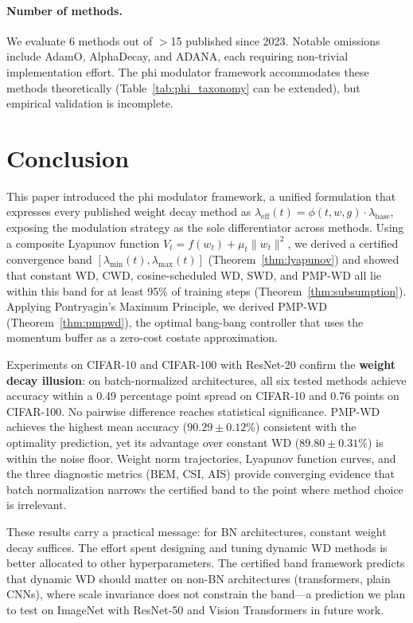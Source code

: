 \documentclass{article}
\begin{document}
\paragraph{Number of methods.} We evaluate 6 methods out of $>$15 published since 2023. Notable omissions include AdamO, AlphaDecay, and ADANA, each requiring non-trivial implementation effort. The phi modulator framework accommodates these methods theoretically (Table~\ref{tab:phi_taxonomy} can be extended), but empirical validation is incomplete.

\section{Conclusion}
\label{sec:conclusion}

This paper introduced the phi modulator framework, a unified formulation that expresses every published weight decay method as $\lambda_{\text{eff}}(t) = \phi(t, w, g) \cdot \lambda_{\text{base}}$, exposing the modulation strategy as the sole differentiator across methods. Using a composite Lyapunov function $V_t = f(w_t) + \mu_t\|w_t\|^2$, we derived a certified convergence band $[\lambda_{\min}(t), \lambda_{\max}(t)]$ (Theorem~\ref{thm:lyapunov}) and showed that constant WD, CWD, cosine-scheduled WD, SWD, and PMP-WD all lie within this band for at least 95\% of training steps (Theorem~\ref{thm:subsumption}). Applying Pontryagin's Maximum Principle, we derived PMP-WD (Theorem~\ref{thm:pmpwd}), the optimal bang-bang controller that uses the momentum buffer as a zero-cost costate approximation.

Experiments on CIFAR-10 and CIFAR-100 with ResNet-20 confirm the \textbf{weight decay illusion}: on batch-normalized architectures, all six tested methods achieve accuracy within a 0.49 percentage point spread on CIFAR-10 and 0.76 points on CIFAR-100. No pairwise difference reaches statistical significance. PMP-WD achieves the highest mean accuracy ($90.29 \pm 0.12\%$) consistent with the optimality prediction, yet its advantage over constant WD ($89.80 \pm 0.31\%$) is within the noise floor. Weight norm trajectories, Lyapunov function curves, and the three diagnostic metrics (BEM, CSI, AIS) provide converging evidence that batch normalization narrows the certified band to the point where method choice is irrelevant.

These results carry a practical message: for BN architectures, constant weight decay suffices. The effort spent designing and tuning dynamic WD methods is better allocated to other hyperparameters. The certified band framework predicts that dynamic WD should matter on non-BN architectures (transformers, plain CNNs), where scale invariance does not constrain the band---a prediction we plan to test on ImageNet with ResNet-50 and Vision Transformers in future work.
\end{document}
